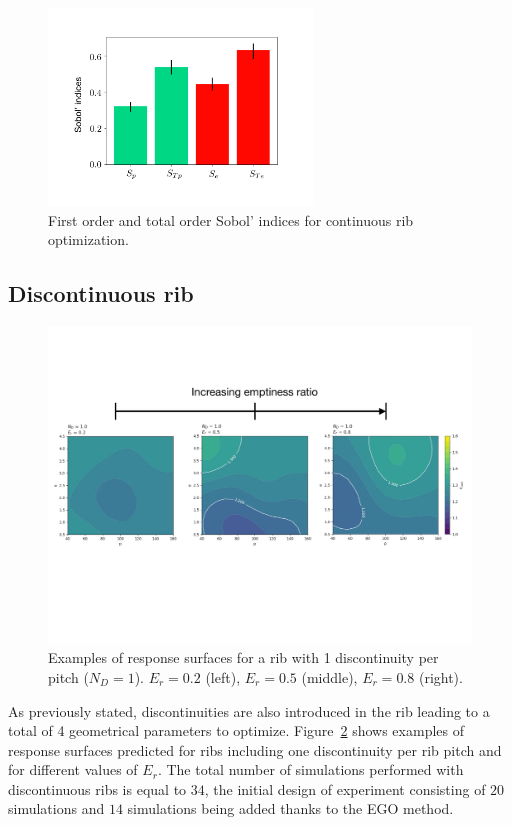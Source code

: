 \begin{figure}[h]
\centering
\includegraphics[width=7cm]{fig/applications/optim/Sobol_continu.pdf}
\caption{First order and total order Sobol' indices for continuous rib optimization.}
\label{sensitivity2D}
\end{figure}

\subsection{Discontinuous rib}
\label{sec:discontinuous_rib}

\begin{figure}[ht!]
\centering
\includegraphics[width=18cm]{fig/applications/optim/GP_1ND.pdf}
\caption{Examples of response surfaces for a rib with 1 discontinuity per pitch ($N_D=1$). $E_r=0.2$ (left), $E_r=0.5$ (middle), $E_r=0.8$ (right).}
\label{1D_RS}
\end{figure}

As previously stated, discontinuities are also introduced in the rib leading to a total of 4 geometrical parameters to optimize. Figure~\ref{1D_RS} shows examples of response surfaces predicted for ribs including one discontinuity per rib pitch and for different values of $E_r$. The total number of simulations performed with discontinuous ribs is equal to $34$, the initial design of experiment consisting of $20$ simulations and $14$ simulations being added thanks to the EGO method.\\

